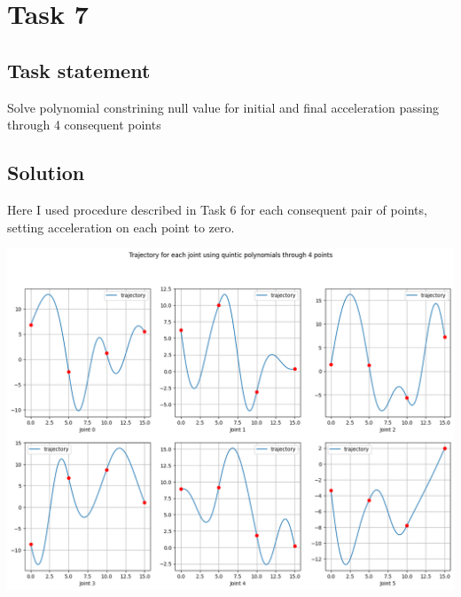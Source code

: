 \section*{Task 7}

\subsection*{Task statement}

Solve polynomial constrining null value for initial and final acceleration passing through 4 consequent points

\subsection*{Solution}

Here I used procedure described in Task 6 for each consequent pair of points, setting acceleration on each point to zero.

\includegraphics[width=\linewidth]{images/trajectory_polynomial_points.png}